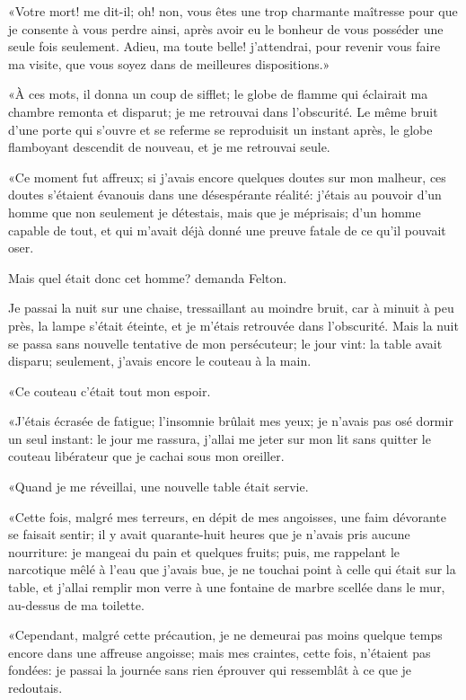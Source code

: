 «Votre mort! me dit-il; oh! non, vous êtes une trop charmante maîtresse pour que je consente à vous perdre ainsi, après avoir eu le bonheur de vous posséder une seule fois seulement. Adieu, ma toute belle! j'attendrai, pour revenir vous faire ma visite, que vous soyez dans de meilleures dispositions.» 

«À ces mots, il donna un coup de sifflet; le globe de flamme qui éclairait ma chambre remonta et disparut; je me retrouvai dans l'obscurité. Le même bruit d'une porte qui s'ouvre et se referme se reproduisit un instant après, le globe flamboyant descendit de nouveau, et je me retrouvai seule. 

«Ce moment fut affreux; si j'avais encore quelques doutes sur mon malheur, ces doutes s'étaient évanouis dans une désespérante réalité: j'étais au pouvoir d'un homme que non seulement je détestais, mais que je méprisais; d'un homme capable de tout, et qui m'avait déjà donné une preuve fatale de ce qu'il pouvait oser. 

\speak  Mais quel était donc cet homme? demanda Felton. 

\speak  Je passai la nuit sur une chaise, tressaillant au moindre bruit, car à minuit à peu près, la lampe s'était éteinte, et je m'étais retrouvée dans l'obscurité. Mais la nuit se passa sans nouvelle tentative de mon persécuteur; le jour vint: la table avait disparu; seulement, j'avais encore le couteau à la main. 

«Ce couteau c'était tout mon espoir. 

«J'étais écrasée de fatigue; l'insomnie brûlait mes yeux; je n'avais pas osé dormir un seul instant: le jour me rassura, j'allai me jeter sur mon lit sans quitter le couteau libérateur que je cachai sous mon oreiller. 

«Quand je me réveillai, une nouvelle table était servie. 

«Cette fois, malgré mes terreurs, en dépit de mes angoisses, une faim dévorante se faisait sentir; il y avait quarante-huit heures que je n'avais pris aucune nourriture: je mangeai du pain et quelques fruits; puis, me rappelant le narcotique mêlé à l'eau que j'avais bue, je ne touchai point à celle qui était sur la table, et j'allai remplir mon verre à une fontaine de marbre scellée dans le mur, au-dessus de ma toilette. 

«Cependant, malgré cette précaution, je ne demeurai pas moins quelque temps encore dans une affreuse angoisse; mais mes craintes, cette fois, n'étaient pas fondées: je passai la journée sans rien éprouver qui ressemblât à ce que je redoutais. 

